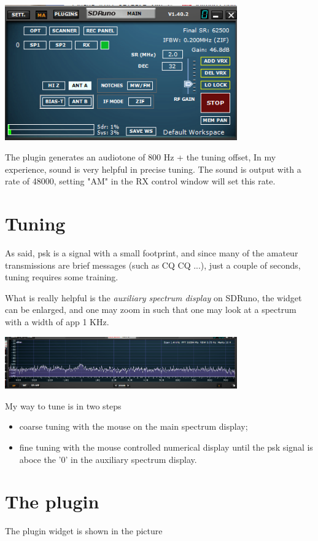 \documentclass[11pt]{article}
\begin{document}
\includegraphics[width=100mm]{main-widget.png}

The plugin generates an audiotone of 800 Hz + the tuning offset,
In my experience, sound is very helpful in precise tuning.
The sound is output with a rate of 48000, setting "AM" in the RX control window
will set this rate.

\section{Tuning}
As said, psk is a signal with a small footprint, and since many of
the amateur transmissions are brief messages (such as CQ CQ ...),
just a couple of seconds, tuning requires some training.
\par
What is really helpful is the {\em auxiliary spectrum display} on 
SDRuno, the widget can be enlarged, and one may zoom in such
that one may look at a spectrum with a width of app 1 KHz.

\includegraphics[width=100mm]{auxiliary-spectrum-display.png}

My way to tune is in two steps
\begin{itemize}
\item coarse tuning with the mouse on the main spectrum display;
\item fine tuning with the mouse controlled numerical display until the
psk signal is aboce the '0' in the auxiliary spectrum display.
\end{itemize}

\section{The plugin}
The plugin widget  is shown in the picture
\end{document}

